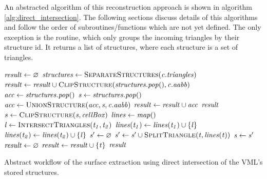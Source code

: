 An abstracted algorithm of this reconstruction approach is shown in algorithm \ref{alg:direct_intersection}.
The following sections discuss details of this algorithms and follow the order of subroutines/functions which are not yet defined.
The only exception is the  routine, which only groups the incoming triangles by their structure id.
It returns a list of structures, where each structure is a set of triangles.

\begin{algorithm}
	\centering
	\begin{algorithmic}[1]
			\State $\mathit{result} \gets \varnothing$
					\State $\var{structures} \gets \Call{SeparateStructures}{\var{c.triangles}}$
						\State $\var{result} \gets \var{result} \cup \Call{ClipStructure}{\var{structures.pop()}, \var{c.aabb}}$
						\State $\mathit{acc} \gets \mathit{structures.pop()}$
							\State $\mathit{s} \gets \mathit{structures.pop()}$
							\State $\var{acc} \gets \Call{UnionStructure}{\var{acc}, \var{s}, \var{c.aabb}}$
						\EndWhile
						\State $\mathit{result} \gets \mathit{result} \cup \mathit{acc}$
					\EndIf
				\EndIf
			\EndFor
			\State \Return $\mathit{result}$
		\EndFunction
		\\
				\State $s \gets \Call{ClipStructure}{\var{s}, \var{cellBox}}$
			\EndFor
			\State $\mathit{lines} \gets \mathit{map()}$ 
				\State $\var{l} \gets \Call{IntersectTriangles}{\var{t_1}, \var{t_2}}$
				 
					\State $\mathit{lines}(\mathit{t_1}) \gets \mathit{lines}(\mathit{t_1}) \cup \{\mathit{l}\}$
					\State $\mathit{lines}(\mathit{t_2}) \gets \mathit{lines}(\mathit{t_2}) \cup \{\mathit{l}\}$
				\EndIf
			\EndFor
				\State $\mathit{s'} \gets \varnothing$
					\State $\var{s'} \gets \var{s'} \cup \Call{SplitTriangle}{\var{t}, \var{lines}(\var{t})}$
				\EndFor
				\State $\mathit{s} \gets \mathit{s'}$
			\EndFor
			\State $\mathit{result} \gets \varnothing$
						\State $\mathit{result} \gets \mathit{result} \cup \{\mathit{t}\}$
					\EndIf
				\EndFor
			\EndFor
			\State \Return $\mathit{result}$
		\EndFunction
	\end{algorithmic}
	\caption{
		Abstract workflow of the surface extraction using direct intersection of the VML's stored structures.
	}
	\label{alg:direct_intersection}
\end{algorithm}


